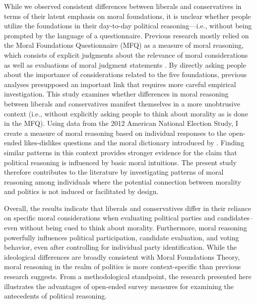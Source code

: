\documentclass[12pt]{article}
\begin{document}
While we observed consistent differences between liberals and conservatives in terms of their latent emphasis on moral foundations, it is unclear whether people utilize the foundations in their day-to-day political reasoning---i.e., without being prompted by the language of a questionnaire. Previous research mostly relied on the Moral Foundations Questionnaire (MFQ) as a measure of moral reasoning, which consists of explicit judgments about the relevance of moral considerations as well as evaluations of moral judgment statements \citep[e.g.][]{graham2011mapping}. By directly asking people about the importance of considerations related to the five foundations, previous analyses presupposed an important link that requires more careful empirical investigation. This study examines whether differences in moral reasoning between liberals and conservatives manifest themselves in a more unobtrusive context (i.e., without explicitly asking people to think about morality as is done in the MFQ). Using data from the 2012 American National Election Study, I create a measure of moral reasoning based on individual responses to the open-ended likes-dislikes questions and the moral dictionary introduced by \citet{graham2009liberals}. Finding similar patterns in this context provides stronger evidence for the claim that political reasoning is influenced by basic moral intuitions. The present study therefore contributes to the literature by investigating patterns of moral reasoning among individuals where the potential connection between morality and politics is not induced or facilitated by design.

Overall, the results indicate that liberals and conservatives differ in their reliance on specific moral considerations when evaluating political parties and candidates--even without being cued to think about morality. Furthermore, moral reasoning powerfully influences political participation, candidate evaluation, and voting behavior, even after controlling for individual party identification. While the ideological differences are broadly consistent with Moral Foundations Theory, moral reasoning in the realm of politics is more context-specific than previous research suggests. From a methodological standpoint, the research presented here illustrates the advantages of open-ended survey measures for examining the antecedents of political reasoning.
\end{document}
